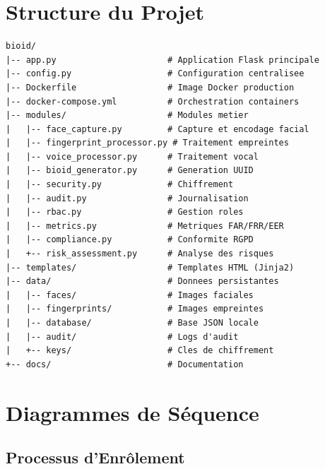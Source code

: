 \documentclass[12pt,a4paper]{report}
\begin{document}
\section{Structure du Projet}

\begin{lstlisting}[caption={Structure des fichiers du projet},label={lst:structure},language={}]
bioid/
|-- app.py                      # Application Flask principale
|-- config.py                   # Configuration centralisee
|-- Dockerfile                  # Image Docker production
|-- docker-compose.yml          # Orchestration containers
|-- modules/                    # Modules metier
|   |-- face_capture.py         # Capture et encodage facial
|   |-- fingerprint_processor.py # Traitement empreintes
|   |-- voice_processor.py      # Traitement vocal
|   |-- bioid_generator.py      # Generation UUID
|   |-- security.py             # Chiffrement
|   |-- audit.py                # Journalisation
|   |-- rbac.py                 # Gestion roles
|   |-- metrics.py              # Metriques FAR/FRR/EER
|   |-- compliance.py           # Conformite RGPD
|   +-- risk_assessment.py      # Analyse des risques
|-- templates/                  # Templates HTML (Jinja2)
|-- data/                       # Donnees persistantes
|   |-- faces/                  # Images faciales
|   |-- fingerprints/           # Images empreintes
|   |-- database/               # Base JSON locale
|   |-- audit/                  # Logs d'audit
|   +-- keys/                   # Cles de chiffrement
+-- docs/                       # Documentation
\end{lstlisting}

\section{Diagrammes de Séquence}

\subsection{Processus d'Enrôlement}
\end{document}
